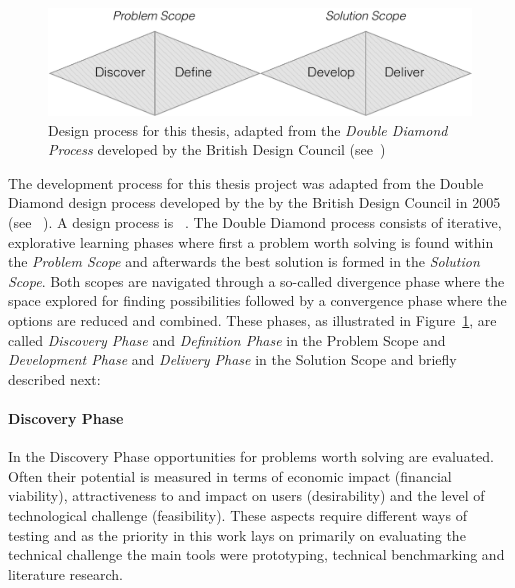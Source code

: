 \begin{figure}[h]
    \centering
    \includegraphics[width=\textwidth]{img/double-diamond.pdf}
    \caption{Design process for this thesis, adapted from the \emph{Double Diamond Process} developed by the British Design Council (see~\cite{Council:2007aa})}
\label{fig:double-diamond}
\end{figure}

The development process for this thesis project was adapted from the Double Diamond design process developed by the by the British Design Council in 2005 (see ~\cite{Council:2007aa}). A design process is ~\cite{Best:2006aa}.
The Double Diamond process consists of iterative, explorative learning phases where first a problem worth solving is found within the \emph{Problem Scope} and afterwards the best solution is formed in the \emph{Solution Scope}. Both scopes are navigated through a so-called divergence phase where the space explored for finding possibilities followed by a convergence phase where the options are reduced and combined. These phases, as illustrated in Figure~\ref{fig:double-diamond}, are called \emph{Discovery Phase} and \emph{Definition Phase} in the Problem Scope and \emph{Development Phase} and \emph{Delivery Phase} in the Solution Scope and briefly described next:

\paragraph{Discovery Phase}
\label{par:Discovery Phase}
In the Discovery Phase opportunities for problems worth solving are evaluated. Often their potential is measured in terms of economic impact (financial viability), attractiveness to and impact on users (desirability) and the level of technological challenge (feasibility).
These aspects require different ways of testing and as the priority in this work lays on primarily on evaluating the technical challenge the main tools were prototyping, technical benchmarking and literature research.


